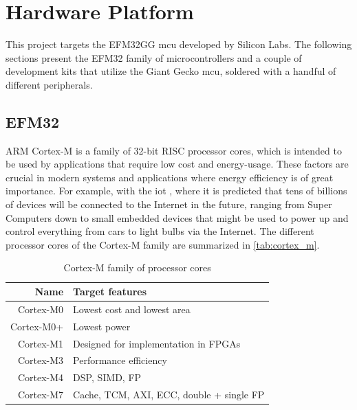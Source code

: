 \section{Hardware Platform}
\label{sec:back:hw}

This project targets the EFM32GG \gls{mcu} developed by Silicon Labs.
The following sections present the EFM32 family of microcontrollers and a couple of development kits that utilize the Giant Gecko \gls{mcu}, soldered with a handful of different peripherals.

\subsection{EFM32}
\label{sub:emf32}

ARM Cortex-M is a family of 32-bit RISC processor cores, which is intended to be used by applications that require low cost and energy-usage.
These factors are crucial in modern systems and applications where energy efficiency is of great importance.
For example, with the \gls{iot} \cite{Valhouli2010}, where it is predicted that tens of billions of devices will be connected to the Internet in the future, ranging from Super Computers down to small embedded devices that might be used to power up and control everything from cars to light bulbs via the Internet.
The different processor cores of the Cortex-M family are summarized in \autoref{tab:cortex_m}.

\begin{table}[ht]
\begin{center}
\begin{tabular}{r|l}
    \textbf{Name} & \textbf{Target features}            \\
    \hline
    Cortex-M0 & Lowest cost and lowest area              \\
    Cortex-M0+ & Lowest power                            \\
    Cortex-M1 & Designed for implementation in FPGAs     \\
    Cortex-M3 & Performance efficiency                   \\
    Cortex-M4 & DSP, SIMD, FP                            \\
    Cortex-M7 & Cache, TCM, AXI, ECC, double + single FP \\
    \hline
    \end{tabular}
\end{center}
\caption{Cortex-M family of processor cores}
\label{tab:cortex_m}
\end{table}

